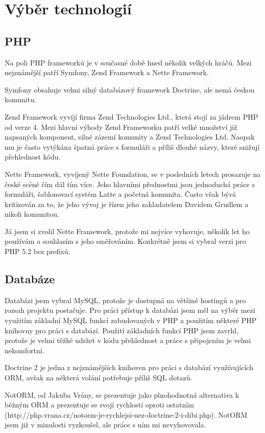 \documentclass[thesis=B,czech]{FITthesis}[2011/06/14]
\begin{document}
\section{Výběr technologií}
\subsection{PHP}
Na poli PHP frameworků je v současné době hned několik velkých hráčů. Mezi nejznámější patří Symfony, Zend Framework a Nette Framework.

Symfony obsahuje velmi silný databázový framework Doctrine, ale nemá českou komunitu.

Zend Framework vyvíjí firma Zend Technologies Ltd., která stojí za jádrem PHP od verze 4. Mezi hlavní výhody Zend Frameworku patří velké množství již napsaných komponent, silné zázemí komunity a Zend Technologies Ltd. Naopak mu je často vytýkána špatná práce s formuláři a příliš dlouhé názvy, které snižují přehlednost kódu. 

Nette Framework, vyvíjený Nette Foundation, se v posledních letech prosazuje na české scéně čím dál tím více. Jeho hlavními přednostmi jsou jednoduchá práce s formuláři, šablonovací systém Latte a početná komunita. Často však bývá kritizován za to, že jeho vývoj je řízen jeho zakladatelem Davidem Grudlem a nikoli komunitou.

Já jsem si zvolil Nette Framework, protože mi nejvíce vyhovuje, několik let ho používám a souhlasím s jeho směřováním. Konkrétně jsem si vybral verzi pro PHP 5.2 bez prefixů.

\subsection{Databáze}
Databázi jsem vybral MySQL, protože je dostupná na většině hostingů a pro rozsah projektu postačuje. Pro práci přístup k databázi jsem měl na výběr mezi využitím základní MySQL funkcí zabudovaných v PHP a použitím některé PHP knihovny pro práci s databází. Použití základních funkcí PHP jsem zavrhl, protože je velmi těžké udržet v kódu přehlednost a práce s připojením je velmi nekomfortní.  

Doctrine 2 je jedna z nejznámějších knihoven pro práci s databází využívajících ORM, avšak na některá volání potřebuje příliš SQL dotazů.

NotORM, od Jakuba Vrány, se prezentuje jako plnohodnotná alternativa k běžným ORM a prezentuje se svojí rychlostí oproti ostatním (http://php.vrana.cz/notorm-je-rychlejsi-nez-doctrine-2-i-dibi.php). NotORM jsem již v minulosti vyzkoušel, ale práce s ním mi nevyhovovala. 
\end{document}
